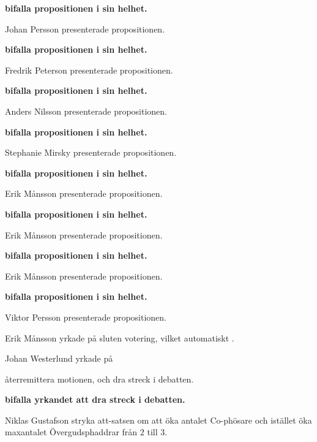 \documentclass[10pt]{article}
\begin{document}
\begin{paragrafer}
\begin{paragrafer}
        \textbf{\Mba bifalla propositionen i sin helhet.}

        Johan Persson presenterade propositionen.

        \textbf{\Mba bifalla propositionen i sin helhet.}

        Fredrik Peterson presenterade propositionen.

        \textbf{\Mba bifalla propositionen i sin helhet.}

        Anders Nilsson presenterade propositionen.

        \textbf{\Mba bifalla propositionen i sin helhet.}

        Stephanie Mirsky presenterade propositionen.

        \textbf{\Mba bifalla propositionen i sin helhet.}

        Erik Månsson presenterade propositionen.

        \textbf{\Mba bifalla propositionen i sin helhet.}

        Erik Månsson presenterade propositionen.

        \textbf{\Mba bifalla propositionen i sin helhet.}

        Erik Månsson presenterade propositionen.

        \textbf{\Mba bifalla propositionen i sin helhet.}

    \end{paragrafer}
Viktor Persson presenterade propositionen.

Erik Månsson yrkade på sluten votering, vilket automatiskt .

Johan Westerlund yrkade på
\begin{attsatser}
    \att återremittera motionen, och
    \att dra streck i debatten.
\end{attsatser}

\textbf{\Mba bifalla yrkandet att dra streck i debatten.}

Niklas Gustafson \ypa stryka att-satsen om att öka antalet Co-phösare och istället öka maxantalet Övergudsphaddrar från 2 till 3. %


\end{paragrafer}
\end{document}
